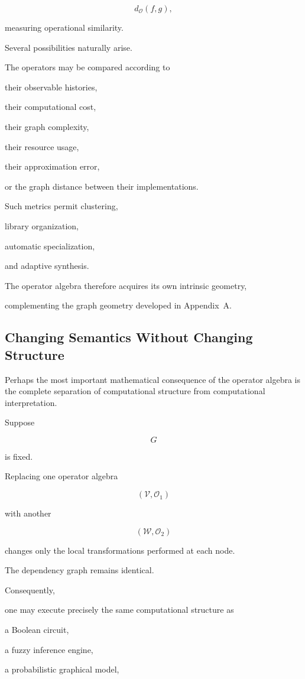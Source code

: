 \documentclass[12pt,oneside]{article}
\begin{document}
\[
d_{\mathcal O}(f,g),
\]

measuring operational similarity.

Several possibilities naturally arise.

The operators may be compared according to

their observable histories,

their computational cost,

their graph complexity,

their resource usage,

their approximation error,

or the graph distance between their implementations.

Such metrics permit clustering,

library organization,

automatic specialization,

and adaptive synthesis.

The operator algebra therefore acquires its own intrinsic geometry,

complementing the graph geometry developed in Appendix~A.

\subsection{Changing Semantics Without Changing Structure}

Perhaps the most important mathematical consequence of the operator algebra is the complete separation of computational structure from computational interpretation.

Suppose

\[
G
\]

is fixed.

Replacing one operator algebra

\[
(\mathcal V,\mathcal O_1)
\]

with another

\[
(\mathcal W,\mathcal O_2)
\]

changes only the local transformations performed at each node.

The dependency graph remains identical.

Consequently,

one may execute precisely the same computational structure as

a Boolean circuit,

a fuzzy inference engine,

a probabilistic graphical model,
\end{document}
